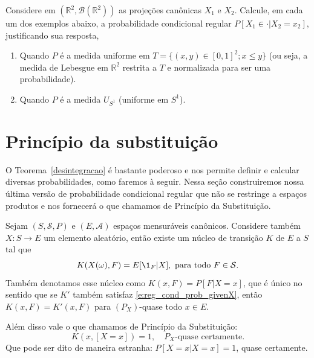 \begin{exercise}
  Considere em $(\mathbb{R}^2, \mathcal{B}(\mathbb{R}^2))$ as projeções canônicas $X_1$ e $X_2$.
  Calcule, em cada um dos exemplos abaixo, a probabilidade condicional regular $P[X_1 \in \cdot|X_2 = x_2]$, justificando sua resposta,
  \begin{enumerate}[\quad a)]
  \item Quando $P$ é a medida uniforme em $T = \{(x,y) \in [0,1]^2; x \leq y\}$ (ou seja, a medida de Lebesgue em $\mathbb{R}^2$ restrita a $T$ e normalizada para ser uma probabilidade).
  \item Quando $P$ é a medida $U_{S^1}$ (uniforme em $S^1$).
  \end{enumerate}
\end{exercise}

\section{Princípio da substituição}


O Teorema~\ref{desintegracao} é bastante poderoso e nos permite definir e calcular diversas probabilidades, como faremos à seguir.
Nessa seção construiremos nossa última versão de probabilidade condicional regular que não se restringe a espaços produtos e nos fornecerá o que chamamos de Princípio da Substituição. 

\begin{theorem}
  \label{t:princ_substit}
  Sejam $(S, \mathcal{S}, P)$ e $(E, \mathcal{A})$ espaços mensuráveis canônicos.
  Considere também $X: S \to E$ um elemento aleatório, então existe um núcleo de transição $K$ de $E$ a $S$ tal que
  \begin{equation}
    \label{e:reg_cond_prob_givenX}
    K(X(\omega), F) = E[\1_{F} | X], \text{ para todo $F \in \mathcal{S}$}.
  \end{equation}
  Também denotamos esse núcleo como $K(x, F) = P[F | X = x]$, que é único no sentido que se $K'$
  também satisfaz \eqref{e:reg_cond_prob_givenX}, então $K(x, F) = K'(x, F)$ para $(P_X)$-quase todo $x \in E$.

  Além disso vale o que chamamos de Princípio da Substituição:
  \begin{equation}
    \label{e:princ_substit}
    K(x, [X = x]) = 1, \quad \text{$P_X$-quase certamente}.
  \end{equation}
  Que pode ser dito de maneira estranha: $P[X = x|X = x] = 1$, quase certamente.
\end{theorem}

